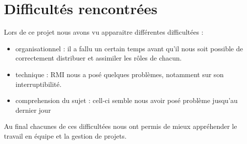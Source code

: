\section{Difficultés rencontrées}
Lors de ce projet nous avons vu apparaitre différentes difficultées : 
\begin{itemize}
 \item organisationnel : il a fallu un certain temps avant qu'il nous soit possible de correctement distribuer et assimiler les rôles de chacun.
 \item technique : RMI nous a posé quelques problèmes, notamment sur son interruptibilité.
 \item comprehension du sujet : cell-ci semble nous avoir posé problème jusqu'au dernier jour
\end{itemize}


Au final chacunes de ces difficultées nous ont permis de mieux appréhender le travail en équipe et la gestion de projets.
